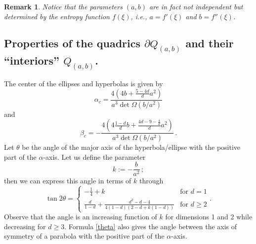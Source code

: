 \documentclass[reqno]{amsart}
\newtheorem{remark}[lemma]{Remark}
\begin{document}
\begin{remark}
    Notice that the parameters $(a,b)$ are in fact not independent but determined by the entropy function $f(\xi)$, i.e., $a=f'(\xi)$ and $b=f''(\xi)$.
\end{remark}


\subsection{Properties of the quadrics $\partial Q_{(a,b)}$ and their ``interiors'' $Q_{(a,b)}$.}
The center of the ellipses and hyperbolas is given by
\begin{equation*}
\alpha_c = \frac{4\left(4b +\frac{5-4d}{d}a^2\right)}{a^3\det\Omega(b/a^2)}
\end{equation*}
and
\[
    \beta_c = -\frac{4\left(4\frac{1-d}{d} b +\frac{4d-9-\frac{4}d}{d}a^2\right)}{a^3\det\Omega(b/a^2)} \,.
\]
Let $\theta$ be the angle of the major axis of the hyperbola/ellipse with the positive part of the $\alpha$-axis. Let us define the parameter 
\begin{equation}\label{defk}
k:=-\frac{b}{a^2}\,;
\end{equation}
then we can express this angle in terms of $k$ through
\begin{equation}\label{theta}
\tan 2\theta = \left\{ \begin{array}{cc}
                                 -\frac14 + k & \mbox{for } d=1\\[2mm]
                                 \frac{d}{1-d} + \frac{d^2-d-4}{4(1-d)(2-d+k(1-d))} & \mbox{for } d\geq 2 
                              \end{array}\right. .
\end{equation}
Observe that the angle is an increasing function of $k$ for dimensions 1 and 2 while decreasing for $d\geq 3$. Formula \eqref{theta} also gives the angle between the axis of symmetry of a parabola with the positive part of the $\alpha$-axis.
\end{document}
